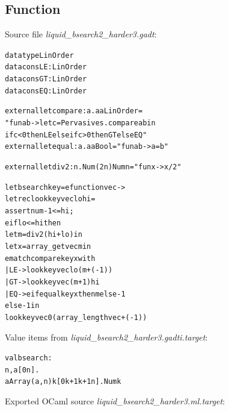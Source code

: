 \documentclass{article}
\newcommand{\tmem}[1]{{\em #1\/}}
\newcommand{\tmverbatim}[1]{{\ttfamily{#1}}}
\newenvironment{tmcode}[1][]{\begin{alltt}}{\end{alltt}}
\begin{document}
\subsection{Function \tmverbatim{bsearch2}}\label{ExBsearch2}

Source file {\tmem{liquid\_bsearch2\_harder3.gadt}}:
\begin{tmcode}
datatype LinOrder
datacons LE : LinOrder
datacons GT : LinOrder
datacons EQ : LinOrder

external let compare : a. a  a  LinOrder =
  "fun a b -> let c = Pervasives.compare a b in
              if c < 0 then LE else if c > 0 then GT else EQ"
external let equal : a. a  a  Bool = "fun a b -> a = b"

external let div2 : n. Num (2 n)  Num n = "fun x -> x / 2"

let bsearch key = efunction vec ->
  let rec look key vec lo hi =
    assert num -1 <= hi;
    eif lo <= hi then
        let m = div2 (hi + lo) in
        let x = array_get vec m in
        ematch compare key x with
          | LE -> look key vec lo (m + (-1))
          | GT -> look key vec (m + 1) hi
          | EQ -> eif equal key x then m else -1
    else -1 in
  look key vec 0 (array_length vec + (-1))
\end{tmcode}
Value items from {\tmem{liquid\_bsearch2\_harder3.gadti.target}}:
\begin{tmcode}
val bsearch :
   n, a[0  n].
   a  Array (a, n)  k[0  k + 1  k + 1  n].Num k
\end{tmcode}
Exported OCaml source {\tmem{liquid\_bsearch2\_harder3.ml.target}}:
\end{document}
